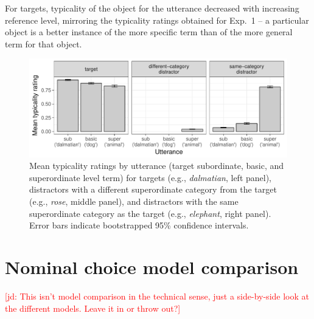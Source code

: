 \documentclass[11pt]{article}
\newcommand{\jd}[1]{\textcolor{Red}{[jd: #1]}}
\begin{document}
For targets, typicality of the object for the utterance decreased with increasing reference level, mirroring the typicality ratings obtained for Exp.~1 -- a particular object is a better instance of the more specific term than of the more general term for that object.

\begin{figure}[h!]
\centering
\includegraphics[width=\textwidth]{pics/exp3typicalityratings}
\caption{Mean typicality ratings by utterance (target subordinate, basic, and superordinate level term) for targets (e.g., \emph{dalmatian}, left panel), distractors with a different superordinate category from the target (e.g., \emph{rose}, middle panel), and distractors with the same superordinate category as the target (e.g., \emph{elephant}, right panel). Error bars indicate bootstrapped 95\% confidence intervals.}
\label{fig:typicalityboxplots}
\end{figure}




\section{Nominal choice model comparison}
\label{app:nominalmodelcomparison}


\jd{This isn't model comparison in the technical sense, just a side-by-side look at the different models. Leave it in or throw out?}
\end{document}
